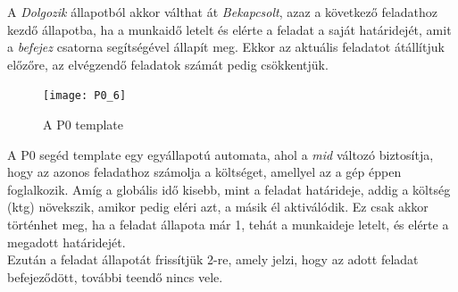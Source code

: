 \documentclass [12pt]{report}
\begin{document}
A \emph{Dolgozik} állapotból akkor válthat át \emph{Bekapcsolt}, azaz a következő feladathoz kezdő állapotba, ha a munkaidő letelt és elérte a feladat a saját határidejét, amit a \emph{befejez} csatorna segítségével állapít meg. Ekkor az aktuális feladatot átállítjuk előzőre, az elvégzendő feladatok számát pedig csökkentjük.\\
\begin{figure}[htpb]
\begin{center}
\texttt{[image: P0\_6]}
\caption{A P0 template}
\end{center}
\end{figure}
A P0 segéd template egy egyállapotú automata, ahol a \emph{mid} változó biztosítja, hogy az azonos feladathoz számolja a költséget, amellyel az a gép éppen foglalkozik. Amíg a globális idő kisebb, mint a feladat határideje, addig a költség (ktg) növekszik, amikor pedig eléri azt, a másik él aktiválódik. Ez csak akkor történhet meg, ha a feladat állapota már 1, tehát a munkaideje letelt, és elérte a megadott határidejét. \\
Ezután a feladat állapotát frissítjük 2-re, amely jelzi, hogy az adott feladat befejeződött, további teendő nincs vele. 
\end{document}
